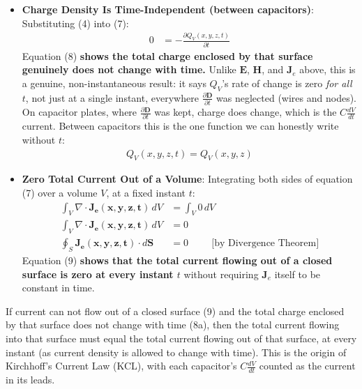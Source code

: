 \begin{enumerate}
    \begin{itemize}
      \item \textbf{Charge Density Is Time-Independent (between capacitors)}:
        Substituting (4) into (7):
        \begin{align*}
          0 &= -\frac{\partial Q_V(x,y,z,t)}{\partial t} \tag{8}
        \end{align*}
        Equation (8) \textbf{shows the total charge enclosed by that
        surface genuinely does not change with time.} Unlike
        \(\mathbf{E}\), \(\mathbf{H}\), and \(\mathbf{J}_e\) above,
        this is a genuine, non-instantaneous result: it says
        \(Q_V\)'s rate of change is zero \emph{for all} \(t\), not
        just at a single instant, everywhere \(\frac{\partial \mathbf{D}}{\partial t}\) was neglected
        (wires and nodes). On capacitor plates, where \(\frac{\partial \mathbf{D}}{\partial t}\) was kept,
        charge does change, which is the \(C\frac{dV}{dt}\) current. Between capacitors
        this is the one function we can honestly write without \(t\):
        \begin{align*}
          Q_V(x,y,z,t) = Q_V(x,y,z) \tag{8a}
        \end{align*}
      \item \textbf{Zero Total Current Out of a Volume}: Integrating
        both sides of equation (7) over a volume \(V\), at a fixed
        instant \(t\):
        \begin{align*}
          \int_V \nabla \cdot \mathbf{J_e(x,y,z,t)} \, dV &= \int_V 0 \, dV \\
          \int_V \nabla \cdot \mathbf{J_e(x,y,z,t)} \, dV &= 0 \\
          \oint_S \mathbf{J_e(x,y,z,t)} \cdot d\mathbf{S} &= 0 \hspace{1cm} \text{[by Divergence Theorem]} \tag{9}
        \end{align*}
        Equation (9) \textbf{shows that the total current flowing out of a
        closed surface is zero at every instant \(t\)} without requiring
        \(\mathbf{J}_e\) itself to be constant in time.
    \end{itemize}
    If current can not flow out of a closed surface (9) and the total charge
    enclosed by that surface does not change with time (8a), then the total
    current flowing into that surface must equal the total current flowing
    out of that surface, at every instant (as current density is allowed to
    change with time). This is the origin of Kirchhoff's Current Law (KCL),
    with each capacitor's \(C\frac{dV}{dt}\) counted as the current in its leads.
\end{enumerate}

